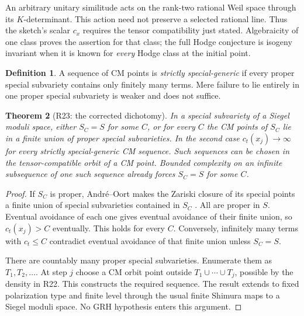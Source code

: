 \documentclass[11pt,a4paper]{article}
\newtheorem{theorem}{Theorem}[section]
\theoremstyle{definition}\newtheorem{definition}[theorem]{Definition}
\theoremstyle{remark}\newtheorem{remark}[theorem]{Remark}
\begin{document}
An arbitrary unitary similitude acts on the rank-two rational Weil space through its $K$-determinant. This action need not preserve a selected rational line. Thus the sketch's scalar $c_x$ requires the tensor compatibility just stated. Algebraicity of one class proves the assertion for that class; the full Hodge conjecture is isogeny invariant when it is known for \emph{every} Hodge class at the initial point.

\begin{definition}
A sequence of CM points is \emph{strictly special-generic} if every proper special subvariety contains only finitely many terms. Mere failure to lie entirely in one proper special subvariety is weaker and does not suffice.
\end{definition}

\begin{theorem}[R23: the corrected dichotomy]\label{R23}
In a special subvariety of a Siegel moduli space, either $S_C=S$ for some $C$, or for every $C$ the CM points of $S_C$ lie in a finite union of proper special subvarieties. In the second case $c_t(x_j)\to\infty$ for every strictly special-generic CM sequence. Such sequences can be chosen in the tensor-compatible orbit of a CM point. Bounded complexity on an infinite subsequence of one such sequence already forces $S_C=S$ for some $C$.
\end{theorem}
\begin{proof}
If $S_C$ is proper, Andr\'e--Oort makes the Zariski closure of its special points a finite union of special subvarieties contained in $S_C$ \citep[Theorem~1.3, p.~380; formulation in Conjecture~1.1, p.~379]{Tsimerman18}. All are proper in $S$. Eventual avoidance of each one gives eventual avoidance of their finite union, so $c_t(x_j)>C$ eventually. This holds for every $C$. Conversely, infinitely many terms with $c_t\le C$ contradict eventual avoidance of that finite union unless $S_C=S$.

There are countably many proper special subvarieties. Enumerate them as $T_1,T_2,\ldots$. At step $j$ choose a CM orbit point outside $T_1\cup\cdots\cup T_j$, possible by the density in R22. This constructs the required sequence. The result extends to fixed polarization type and finite level through the usual finite Shimura maps to a Siegel moduli space. No GRH hypothesis enters this argument.
\end{proof}
\end{document}
